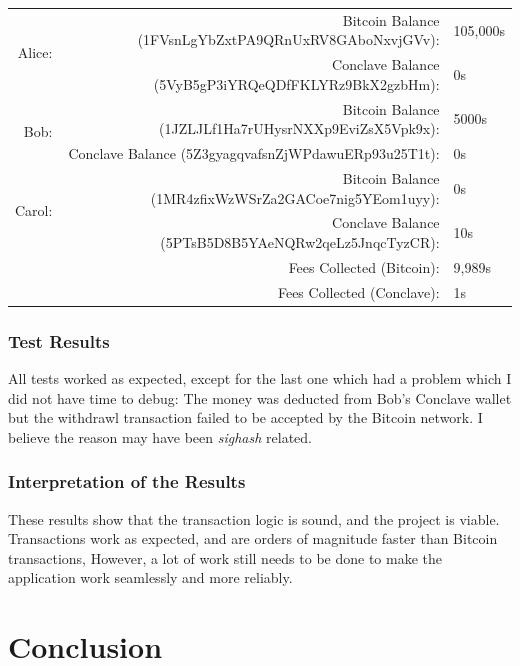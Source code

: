 \documentclass{report}
\begin{document}
			\begin{center}
			\bgroup
			\small
			\def\arraystretch{1.5}
			\begin{tabular}{|r|r|l|}
			\hline
			\multirow{2}{*}{Alice:}    & Bitcoin Balance (1FVsnLgYbZxtPA9QRnUxRV8GAboNxvjGVv):    & 105,000s \\ \cline{2-3} 
						               & Conclave Balance (5VyB5gP3iYRQeQDfFKLYRz9BkX2gzbHm):   & 0s \\ \hline
			\multirow{2}{*}{Bob:}      & Bitcoin Balance (1JZLJLf1Ha7rUHysrNXXp9EviZsX5Vpk9x):    & 5000s \\ \cline{2-3} 
						               & Conclave Balance (5Z3gyagqvafsnZjWPdawuERp93u25T1t):   & 0s \\ \hline
			\multirow{2}{*}{Carol:}    & Bitcoin Balance (1MR4zfixWzWSrZa2GACoe7nig5YEom1uyy):    & 0s \\ \cline{2-3} 
						               & Conclave Balance (5PTsB5D8B5YAeNQRw2qeLz5JnqcTyzCR):   & 10s \\ \hline
			\multicolumn{2}{|r|}{Fees Collected (Bitcoin):}  & 9,989s \\ \hline
			\multicolumn{2}{|r|}{Fees Collected (Conclave):} & 1s \\ \hline
			\end{tabular}
			\egroup
			\bigbreak
			\normalsize
			\end{center}
			
			
			
		\subsection{Test Results}
		All tests worked as expected, except for the last one which had a problem which I did not have time to debug: The money was deducted from Bob's Conclave wallet but the withdrawl transaction failed to be accepted by the Bitcoin network. I believe the reason may have been \textit{sighash} \cite{sighash}  related.
		\subsection{Interpretation of the Results}
		These results show that the transaction logic is sound, and the project is viable. Transactions work as expected, and are orders of magnitude faster than Bitcoin transactions, However, a lot of work still needs to be done to make the application work seamlessly and more reliably.
\chapter{Conclusion}
\end{document}
